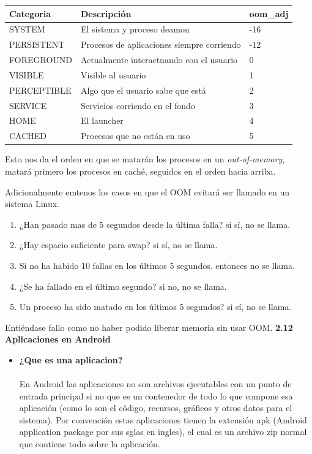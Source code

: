 \documentclass[a4paper]{article}
\begin{document}
\begin{center}
    \begin{tabular}{ | l | p{5cm} | l |}
    \hline
    \textbf{Categoria} & \textbf{Descripción} & \textbf{oom\_adj} \\ \hline
    SYSTEM & El sistema y proceso deamon  & -16 \\ \hline
    PERSISTENT & Procesos de aplicaciones siempre corriendo & -12 \\ \hline
    FOREGROUND & Actualmente interactuando con el usuario & 0 \\ \hline
    VISIBLE & Visible al usuario & 1 \\ \hline
    PERCEPTIBLE & Algo que el usuario sabe que está & 2 \\ \hline
    SERVICE & Servicios corriendo en el fondo & 3 \\ \hline
    HOME & El launcher  & 4 \\ \hline
    CACHED & Procesos que no están en uso & 5 \\ \hline
    \end{tabular}
\end{center}

Esto nos da el orden en que se matarán los procesos en un \textit{out-of-memory}, matará primero los procesos en caché, seguidos en el orden hacia arriba.

Adicionalmente emtenos los casos  en que el OOM evitará ser llamado  en un sistema Linux.\\
\begin{enumerate}
\item ¿Han pasado mas de 5 segundos desde la última falla? si sí, no se llama.
\item ¿Hay espacio suficiente para swap? si sí, no se llama.
\item Si no ha habido 10 fallas en los últimos 5 segundos. entonces no se llama.
\item ¿Se ha fallado en el último segundo? si no, no se llama.
\item
Un proceso ha sido matado en los últimos 5 segundos? si sí, no se llama.
\\
\end{enumerate}
Entiéndase fallo como no haber podido liberar memoria sin usar OOM.
\newpage
\textbf{\Large{2.12 \; Aplicaciones en Android}}\\[0.4em]
\begin{itemize}
\item \textbf{¿Que es una aplicacion?} \\ \\
En Android las aplicaciones no son archivos ejecutables con un punto de entrada principal si no que es un contenedor de todo lo que compone esa aplicación (como lo son el código, recursos, gráficos y otros datos para el sistema). Por convención estas aplicaciones tienen la extensión apk (Android application package por sus sglas en ingles), el cual es un archivo zip normal que contiene todo sobre la aplicación. \\ 
\end{itemize}
\end{document}
